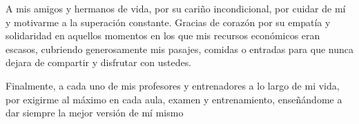 A mis amigos y hermanos de vida, por su cariño incondicional, por cuidar de mí y motivarme a la superación constante. Gracias de corazón por su empatía y solidaridad en aquellos momentos en los que mis recursos económicos eran escasos, cubriendo generosamente mis pasajes, comidas o entradas para que nunca dejara de compartir y disfrutar con ustedes.

Finalmente, a cada uno de mis profesores y entrenadores a lo largo de mi vida, por exigirme al máximo en cada aula, examen y entrenamiento, enseñándome a dar siempre la mejor versión de mí mismo
\vspace{0.5cm}
\justify
\normalsize



\newpage